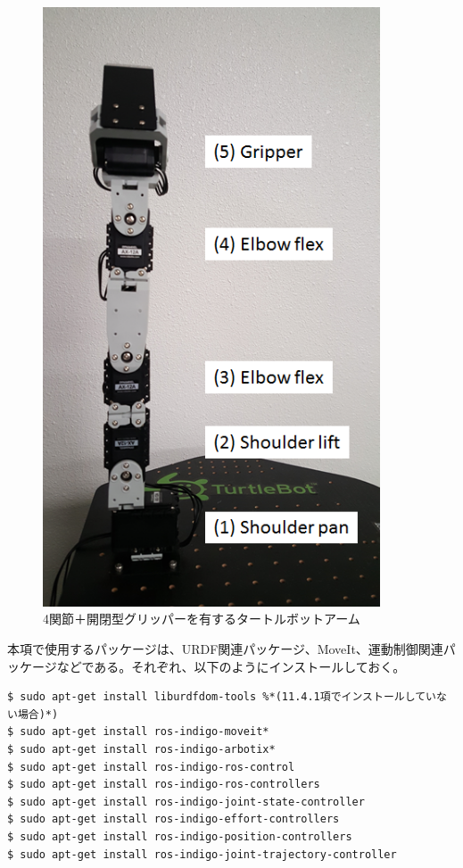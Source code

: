 \begin{figure}[htp]
  \centering
  \includegraphics[width=10cm]{pictures/chapter11/pic_11_10.png}
  \caption{4関節＋開閉型グリッパーを有するタートルボットアーム}
\end{figure}

本項で使用するパッケージは、URDF関連パッケージ、MoveIt、運動制御関連パッケージなどである。それぞれ、以下のようにインストールしておく。

\begin{lstlisting}[language=ROS]
$ sudo apt-get install liburdfdom-tools %*(11.4.1項でインストールしていない場合)*)
$ sudo apt-get install ros-indigo-moveit*
$ sudo apt-get install ros-indigo-arbotix*
$ sudo apt-get install ros-indigo-ros-control
$ sudo apt-get install ros-indigo-ros-controllers
$ sudo apt-get install ros-indigo-joint-state-controller
$ sudo apt-get install ros-indigo-effort-controllers
$ sudo apt-get install ros-indigo-position-controllers
$ sudo apt-get install ros-indigo-joint-trajectory-controller
\end{lstlisting}

